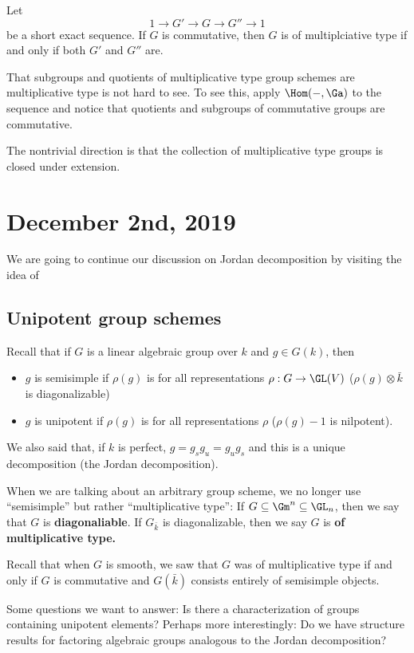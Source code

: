 \documentclass[12pt]{article}
\begin{document}
\begin{cor}
	Let 
	\[1\to G'\to G\to G''\to 1\]
	be a short exact sequence. If $G$ is commutative, then $G$ is of multiplciative type if and only if both $G'$ and $G''$ are.
\end{cor}
\begin{rmk}
	That subgroups and quotients of multiplicative type group schemes are multiplicative type is not hard to see. To see this, apply $\Hom(-,\Ga)$ to the sequence and notice that quotients and subgroups 
	of commutative groups are commutative.
	
	The nontrivial direction is that the collection of multiplicative type groups is closed under extension. 
\end{rmk}

\section{December 2nd, 2019}
We are going to continue our discussion on Jordan decomposition by visiting the idea of 
\subsection{Unipotent group schemes}
Recall that if $G$ is a linear algebraic group over $k$ and $g\in G(k)$, then 
\begin{itemize}
	\item $g$ is semisimple if $\rho(g)$ is for all representations $\rho:G\to \GL(V)$ ($\rho(g)\otimes \bar k$ is diagonalizable)
	\item $g$ is unipotent if $\rho(g)$ is for all representations $\rho$ ($\rho(g)-1$ is nilpotent).
\end{itemize}

We also said that, if $k$ is perfect, $g=g_sg_u=g_ug_s$ and this is a unique decomposition (the Jordan decomposition).

When we are talking about an arbitrary group scheme, we no longer use ``semisimple'' but rather ``multiplicative type'': 
If $G\subseteq \Gm^n\subseteq\GL_n$, then we say that $G$ is \textbf{diagonaliable}. If $G_{\bar k}$ is diagonalizable, then 
we say $G$ is \textbf{of multiplicative type.}

Recall that when $G$ is smooth, we saw that $G$ was of multiplicative type if and only if $G$ is commutative and $G(\bar k)$ consists entirely of semisimple objects.

Some questions we want to answer: Is there a characterization of groups containing unipotent elements? Perhaps more interestingly:
Do we have structure results for factoring algebraic groups analogous to the Jordan decomposition?
\end{document}
